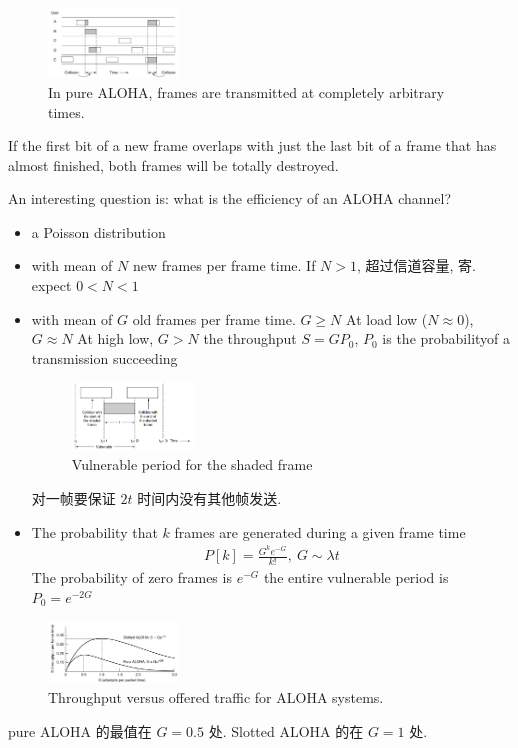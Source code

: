 \begin{figure}[!htb]
    \centering
    \includegraphics[width=0.309\textwidth]{pic/CN4/pure ALOHA.png}
    \caption{In pure ALOHA, frames are transmitted at completely arbitrary times.}
\end{figure}
If the first bit of a new frame overlaps with just the last bit of a frame that has almost finished, both frames will be totally destroyed.

An interesting question is: what is the efficiency of an ALOHA channel?
\begin{itemize}
    \item a Poisson distribution
    \item with mean of $N$ new frames per frame time. %
    \subitem If $N>1$, 超过信道容量, 寄. 
    \subitem expect $0<N<1$ 
    \item with mean of $G$ old frames per frame time.
    \subitem $G\ge N$
    \subitem At load low ($N\approx 0$), $G\approx N$
    \subitem At high low, $G>N$
    \subitem the throughput $S=GP_0$,  $P_0$ is the probabilityof a transmission succeeding

    \begin{figure}[!htb]
        \centering
        \includegraphics[width=0.309\textwidth]{pic/CN4/Vulnerable period for the shaded frame}
        \caption{Vulnerable period for the shaded frame}
    \end{figure}
    对一帧要保证 $2t$ 时间内没有其他帧发送. 
    \item The probability that $k$ frames are generated during a given frame time
    \begin{align*}
        P[k]=\frac{G^ke^{-G}}{k!},\ G\sim \lambda t
    \end{align*}
    \subitem The probability of zero frames is $e^{-G}$
    \subitem the entire vulnerable period is $P_0=e^{-2G}$
\end{itemize}

\begin{figure}[!htb]
    \centering
    \includegraphics[width=0.309\textwidth]{pic/CN4/Throughput versus offered traffic for ALOHA systems.}
    \caption{Throughput versus offered traffic for ALOHA systems.}
\end{figure}
pure ALOHA 的最值在 $G=0.5$ 处.  Slotted ALOHA 的在 $G=1$ 处. 

